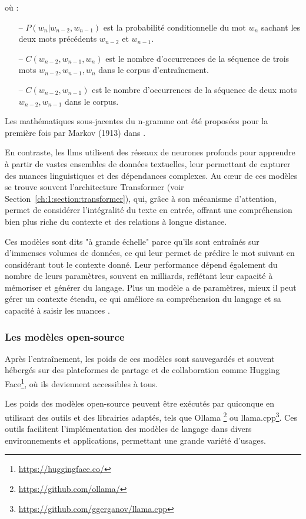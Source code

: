 où :
\begin{itemize}
    \item[--] \(P(w_n | w_{n-2}, w_{n-1})\) est la probabilité conditionnelle du mot \(w_n\) sachant les deux mots précédents \(w_{n-2}\) et \(w_{n-1}\).
    \item[--] \(C(w_{n-2}, w_{n-1}, w_n)\) est le nombre d'occurrences de la séquence de trois mots \(w_{n-2}, w_{n-1}, w_n\) dans le corpus d'entraînement.
    \item[--] \(C(w_{n-2}, w_{n-1})\) est le nombre d'occurrences de la séquence de deux mots \(w_{n-2}, w_{n-1}\) dans le corpus.
\end{itemize}

Les mathématiques sous-jacentes du n-gramme ont été proposées pour la première fois par Markov (1913) dans \cite{Markov}.

En contraste, les \acfp{llm} utilisent des réseaux de neurones profonds pour apprendre à partir de vastes ensembles de données textuelles, leur permettant de capturer des nuances linguistiques et des dépendances complexes. Au cœur de ces modèles se trouve souvent l'architecture Transformer (voir Section~\ref{ch:1:section:transformer}), qui, grâce à son mécanisme d'attention, permet de considérer l'intégralité du texte en entrée, offrant une compréhension bien plus riche du contexte et des relations à longue distance.

Ces modèles sont dits "à grande échelle" parce qu'ils sont entraînés sur d'immenses volumes de données, ce qui leur permet de prédire le mot suivant en considérant tout le contexte donné. Leur performance dépend également du nombre de leurs paramètres, souvent en milliards, reflétant leur capacité à mémoriser et générer du langage. Plus un modèle a de paramètres, mieux il peut gérer un contexte étendu, ce qui améliore sa compréhension du langage et sa capacité à saisir les nuances \cite{Caelen_Blete_2023}.

\subsubsection{Les modèles open-source}

Après l'entraînement, les poids de ces modèles sont sauvegardés et souvent hébergés sur des plateformes de partage et de collaboration comme Hugging Face\footnote{\href{https://huggingface.co/}{https://huggingface.co/}}, où ils deviennent accessibles à tous.

Les poids des modèles open-source peuvent être exécutés par quiconque en utilisant des outils et des librairies adaptés, tels que Ollama \footnote{\href{https://github.com/ollama/}{https://github.com/ollama/}} ou llama.cpp\footnote{\href{https://github.com/ggerganov/llama.cpp}{https://github.com/ggerganov/llama.cpp}}. Ces outils facilitent l'implémentation des modèles de langage dans divers environnements et applications, permettant une grande variété d'usages.

